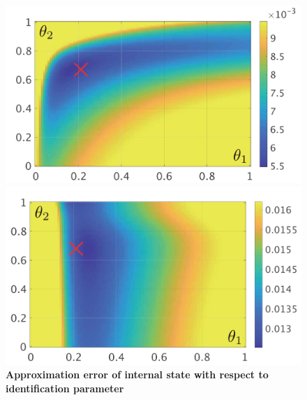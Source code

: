 \documentclass[graybox, envcountchap]{svmult}
\begin{document}
\begin{figure}[t!]
  \centering
  {
  \begin{minipage}{0.49\linewidth}
    \centering
    \includegraphics[width = 1\linewidth]{figs/heatdelta}
    \medskip
  \end{minipage}
  \begin{minipage}{0.49\linewidth}
    \centering
    \includegraphics[width = 1\linewidth]{figs/heatE}
    \medskip
  \end{minipage}
}
 \caption{\textbf{Approximation error of internal state with respect to identification parameter}}
 \label{fig:datamodeling}
\medskip
\end{figure}
\end{document}
